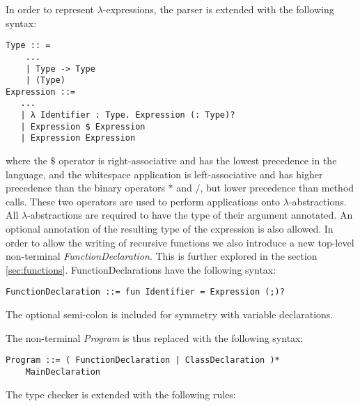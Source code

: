 In order to represent $\lambda$-expressions, the parser is extended with the following syntax:

\begin{lstlisting}
Type :: =
    ...
    | Type -> Type
    | (Type)
Expression ::=
   ...
   | λ Identifier : Type. Expression (: Type)?
   | Expression $ Expression
   | Expression Expression
\end{lstlisting}
where the $\$$ operator is right-associative and has the lowest precedence in the language, and the whitespace application is left-associative and has higher precedence than the binary operators $*$ and $/$, but lower precedence than method calls. These two operators are used to perform applications onto $\lambda$-abstractions. All $\lambda$-abstractions are required to have the type of their argument annotated. An optional annotation of the resulting type of the expression is also allowed. In order to allow the writing of recursive functions we also introduce a new top-level non-terminal \textit{FunctionDeclaration}. This is further explored in the section \ref{sec:functions}. FunctionDeclarations have the following syntax:

\begin{lstlisting}
FunctionDeclaration ::= fun Identifier = Expression (;)?
\end{lstlisting}
The optional semi-colon is included for symmetry with variable declarations.

The non-terminal \textit{Program} is thus replaced with the following syntax:
\begin{lstlisting}
Program ::= ( FunctionDeclaration | ClassDeclaration )*
	MainDeclaration
\end{lstlisting}

The type checker is extended with the following rules:

